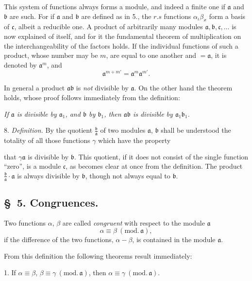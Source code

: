 \documentclass{article}
\begin{document}
This system of functions always forms a module, and indeed a finite one if $\mathfrak{a}$ and $\mathfrak{b}$ are such. For if $\mathfrak{a}$ and $\mathfrak{b}$ are defined as in 5., the $r.s$ functions $\alpha_{\iota}\beta_{\varkappa}$ form a basis of $\mathfrak{c}$, albeit a reducible one. A product of arbitrarily many modules $\mathfrak{a}, \mathfrak{b}, \mathfrak{c}, \ldots$ is now explained of itself, and for it the fundamental theorem of multiplication on the interchangeability of the factors holds. If the individual functions of such a product, whose number may be $m$, are equal to one another and $= \mathfrak{a}$, it is denoted by $\mathfrak{a}^{m}$, and
\[ \mathfrak{a}^{m+m'} = \mathfrak{a}^{m}\mathfrak{a}^{m'}. \]

In general a product $\mathfrak{a}\mathfrak{b}$ is \emph{not} divisible by $\mathfrak{a}$. On the other hand the theorem holds, whose proof follows immediately from the definition:

\emph{If $\mathfrak{a}$ is divisible by $\mathfrak{a}_{1}$, and $\mathfrak{b}$ by $\mathfrak{b}_{1}$, then $\mathfrak{a}\mathfrak{b}$ is divisible by $\mathfrak{a}_{1}\mathfrak{b}_{1}$.}

8. \emph{Definition.} By the quotient $\frac{\mathfrak{b}}{\mathfrak{a}}$ of two modules $\mathfrak{a}$, $\mathfrak{b}$ shall be understood the totality of all those functions $\gamma$ which have the property

that $\gamma\mathfrak{a}$ is divisible by $\mathfrak{b}$. This quotient, if it does not consist of the single function ``zero'', is a module $\mathfrak{c}$, as becomes clear at once from the definition. The product $\frac{\mathfrak{b}}{\mathfrak{a}}\cdot\mathfrak{a}$ is always divisible by $\mathfrak{b}$, though not always equal to $\mathfrak{b}$.

\subsection*{§~5. Congruences.}

Two functions $\alpha$, $\beta$ are called \emph{congruent} with respect to the module $\mathfrak{a}$
\[ \alpha \equiv \beta \ (\text{mod.}\,\mathfrak{a}), \]
if the difference of the two functions, $\alpha-\beta$, is contained in the module $\mathfrak{a}$.

From this definition the following theorems result immediately:

1. If $\alpha \equiv \beta$, $\beta \equiv \gamma \ (\text{mod.}\,\mathfrak{a})$, then $\alpha \equiv \gamma \ (\text{mod.}\,\mathfrak{a})$.
\end{document}
